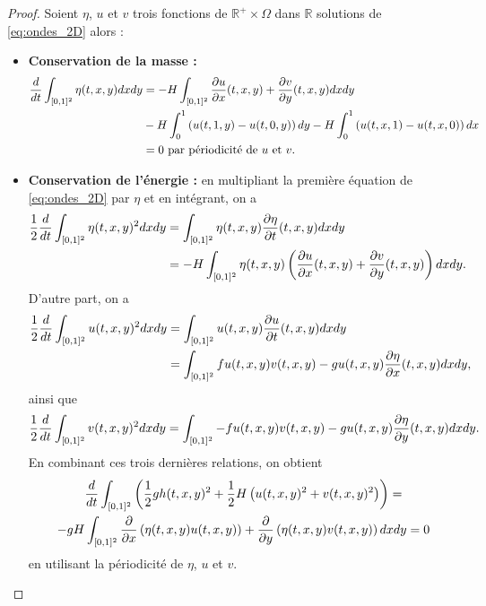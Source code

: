 \begin{proof}
Soient $\eta$, $u$ et $v$ trois fonctions de $\mathbb{R}^+ \times \Omega$ dans $\mathbb{R}$ solutions de \eqref{eq:ondes_2D} alors :
\begin{itemize}
\item \textbf{Conservation de la masse :}
\begin{align*}
\dfrac{d}{dt} \displaystyle\int_{[0,1]^2} \eta(t,x,y)dxdy & = - H \displaystyle\int_{[0,1]^2} \dfrac{\partial u}{\partial x}(t,x,y) + \dfrac{\partial v}{\partial y}(t,x,y) dx dy \\
	& - H \displaystyle\int_0^1 \left( u(t,1,y) - u(t,0,y) \right)dy  - H \displaystyle\int_0^1 \left( u(t,x,1) - u(t,x,0) \right)dx \\
	& = 0 \text{ par périodicité de } u \text{ et } v. 
\end{align*}

\item \textbf{Conservation de l'énergie :} en multipliant la première équation de \eqref{eq:ondes_2D} par $\eta$ et en intégrant, on a 
\begin{align*}
\dfrac{1}{2} \dfrac{d}{dt} \displaystyle\int_{[0,1]^2} \eta(t,x,y)^2 dx dy & = \displaystyle\int_{[0,1]^2} \eta(t,x,y) \dfrac{\partial \eta}{\partial t}(t,x,y) dx dy \\
	& = - H \displaystyle\int_{[0,1]^2} \eta(t,x,y) \left( \dfrac{\partial u}{\partial x}(t,x,y) + \dfrac{\partial v}{\partial y}(t,x,y) \right) dx dy.
\end{align*}
D'autre part, on a 
\begin{align*}
\dfrac{1}{2} \dfrac{d}{dt} \displaystyle\int_{[0,1]^2} u(t,x,y)^2 dx dy & = \displaystyle\int_{[0,1]^2} u(t,x,y) \dfrac{\partial u}{\partial t}(t,x,y) dx dy \\
& = \displaystyle\int_{[0,1]^2} f u(t,x,y) v(t,x,y) - g u(t,x,y) \dfrac{\partial \eta}{\partial x}(t,x,y) dx dy,
\end{align*}
ainsi que 
\begin{equation*}
\dfrac{1}{2} \dfrac{d}{dt} \displaystyle\int_{[0,1]^2} v(t,x,y)^2 dx dy =  \displaystyle\int_{[0,1]^2}  - f u(t,x,y) v(t,x,y) - g u(t,x,y) \dfrac{\partial \eta}{\partial y}(t,x,y) dx dy.
\end{equation*}
En combinant ces trois dernières relations, on obtient
\begin{multline*}
\dfrac{d}{dt} \displaystyle\int_{[0,1]^2} \left( \dfrac{1}{2} g h(t,x,y)^2 + \dfrac{1}{2} H \left( u(t,x,y)^2 + v(t,x,y)^2 \right) \right) = \\
- g H \displaystyle\int_{[0,1]^2} \dfrac{\partial}{\partial x} \left( \eta(t,x,y) u (t,x,y) \right) +  \dfrac{\partial}{\partial y} \left( \eta(t,x,y) v (t,x,y) \right) dx dy
= 0
\end{multline*}
en utilisant la périodicité de $\eta$, $u$ et $v$.
\end{itemize}
\end{proof}








